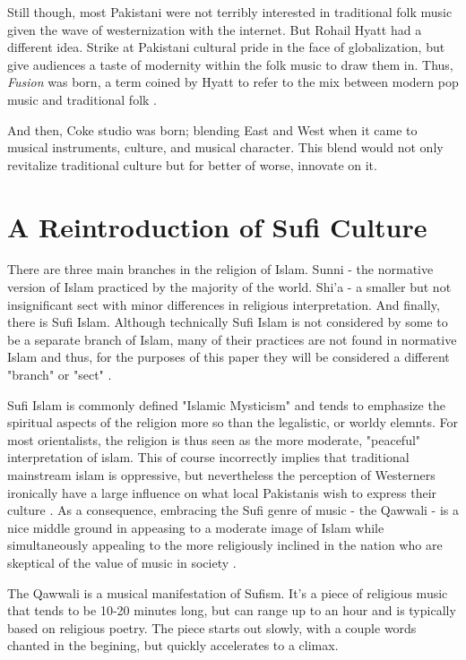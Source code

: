 \documentclass{article}
\begin{document}
  Still though, most Pakistani were not terribly interested in traditional folk 
  music given the wave of westernization with the internet. But Rohail Hyatt had a 
  different idea. Strike at Pakistani cultural pride in the face of globalization, but 
  give audiences a taste of modernity within the folk music to draw them in. Thus, 
  \textit{Fusion} was born, a term coined by Hyatt to refer to the mix between modern pop music
  and traditional folk \autocite{dhanwani2014coke}.

  And then, Coke studio was born; blending East and West when it came to musical
  instruments, culture, and musical character. This blend would not only
  revitalize traditional culture but for better of worse, innovate on it.

  \section{A Reintroduction of Sufi Culture}

  There are three main branches in the religion of Islam. Sunni - the normative
  version of Islam practiced by the majority of the world. Shi'a - a smaller but
  not insignificant sect with minor differences in religious interpretation. And
  finally, there is Sufi Islam. Although technically Sufi Islam is not
  considered by some to be a separate branch of Islam, many of their practices
  are not found in normative Islam and thus, for the purposes of this paper they
  will be considered a different "branch" or "sect" \autocite{sufibackground}. 

  Sufi Islam is commonly defined "Islamic Mysticism" and tends to emphasize the 
  spiritual aspects of the religion more so than the legalistic, or worldy
  elemnts. For most orientalists, the religion is thus seen as the more 
  moderate, "peaceful" interpretation of islam. This of
  course incorrectly implies that traditional mainstream islam is oppressive,
  but nevertheless the perception of Westerners ironically have a large
  influence on what local Pakistanis wish to express their culture \autocite{beg2020fizzy}. As a
  consequence, embracing the Sufi genre of music - the Qawwali - is a nice
  middle ground in appeasing to a moderate image of Islam while simultaneously 
  appealing to the more religiously inclined in the nation who are skeptical of
  the value of music in society \autocite{williams2019soundtrack}.

  The Qawwali is a musical manifestation of Sufism. It's a piece of religious music 
  that tends to be 10-20 minutes long, but can range up to an hour and is typically 
  based on religious poetry. The piece starts out slowly, with a couple words chanted
  in the begining, but quickly accelerates to a climax. 
\end{document}
